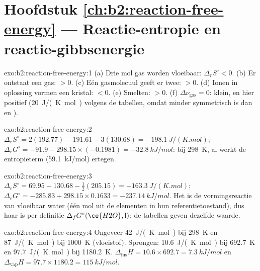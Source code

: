 \section*{Hoofdstuk \ref{ch:b2:reaction-free-energy} --- Reactie-entropie en reactie-gibbsenergie}

\begin{solution}{exo:b2:reaction-free-energy:1}
(a) Drie mol gas worden vloeibaar: $\Delta_r S^\circ < 0$. (b) Er ontstaat een gas:
$> 0$. (c) Eén gasmolecuul geeft er twee: $> 0$. (d) Ionen in oplossing
vormen een kristal: $< 0$. (e) Smelten: $> 0$. (f) $\Delta\nu_{\text{gas}} = 0$:
klein, en hier positief (\qty{+20}{J/(K.mol)} volgens de tabellen, omdat 
minder symmetrisch is dan  en ).
\end{solution}

\begin{solution}{exo:b2:reaction-free-energy:2}
$\Delta_r S^\circ = 2(192.77) - 191.61 - 3(130.68) = \qty{-198.1}{J/(K.mol)}$;
$\Delta_r G^\circ = -91.9 - 298.15 \times (-0.1981) = \qty{-32.8}{kJ/mol}$:
 bij \qty{298}{K}, al werkt de entropieterm (\qty{+59.1}{kJ/mol})
ertegen.
\end{solution}

\begin{solution}{exo:b2:reaction-free-energy:3}
$\Delta_r S^\circ = 69.95 - 130.68 - \tfrac12(205.15) = \qty{-163.3}{J/(K.mol)}$;
$\Delta_r G^\circ = -285.83 + 298.15 \times 0.1633 = \qty{-237.14}{kJ/mol}$.
Het is de vormingsreactie van vloeibaar water (één mol uit de elementen in
hun referentietoestand), dus haar  is per
definitie $\Delta_f G^\circ(\ce{H2O}, \text{l})$; de tabellen geven dezelfde
waarde.
\end{solution}

\begin{solution}{exo:b2:reaction-free-energy:4}
Ongeveer \qty{42}{J/(K.mol)} bij \qty{298}{K} en \qty{87}{J/(K.mol)} bij
\qty{1000}{K} (vloeistof). Sprongen: \qty{10.6}{J/(K.mol)} bij \qty{692.7}{K} en
\qty{97.7}{J/(K.mol)} bij \qty{1180.2}{K}. $\Delta_{\text{fus}}H = 10.6 \times
692.7 = \qty{7.3}{kJ/mol}$ en $\Delta_{\text{vap}}H = 97.7 \times 1180.2 =
\qty{115}{kJ/mol}$.
\end{solution}

